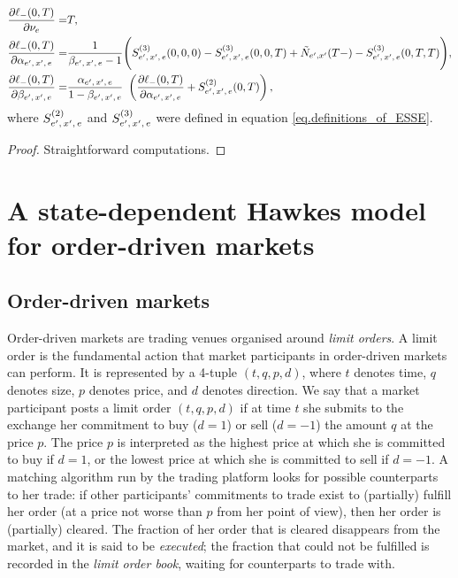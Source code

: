 \documentclass[10pt, article,table]{article}
\begin{document}
\begin{prop}
\begin{itemize}
\begin{equation}
\begin{split}
   \frac{\partial\ell_{-}(0,T)}{\partial\nu_e}
   =&
   T,
   \\
   \frac{\partial\ell_{-}(0,T)}{\partial\alpha_{e^{\prime},\, x^{\prime},\, e}}
   =&
   \frac{1}{\beta_{e^{\prime},\, x^{\prime},\, e} - 1}
   \Bigg(
   S^{(3)}_{e^{\prime},\, x^{\prime},\, e}(0,0,0)  - S^{(3)}_{e^{\prime},\, x^{\prime},\, e}(0,0,T)
    +\tilde{N}_{e^{\prime},x^{\prime}}(T-)
   - S^{(3)}_{e^{\prime},\, x^{\prime},\, e}(0,T,T)
   \Bigg),
   \\
   \frac{\partial\ell_{-}(0,T)}{\partial\beta_{e^{\prime},\, x^{\prime},\, e}}
   =&
   \frac{\alpha_{e^{\prime},\, x^{\prime},\, e}}{1-\beta_{e^{\prime},\, x^{\prime},\, e}}\
   \left(
   \frac{\partial\ell_{-}(0,T)}{\partial\alpha_{e^{\prime},\, x^{\prime},\, e}}
   +S^{(2)}_{e^{\prime},\, x^{\prime},\, e}(0,T)
   \right),
  \end{split}
 \end{equation}
 where $S^{(2)}_{e^{\prime},\, x^{\prime},\, e}$ and $S^{(3)}_{e^{\prime},\, x^{\prime},\, e}$ were defined in equation \eqref{eq.definitions_of_ESSE}.
 \end{itemize}
\end{prop}
\begin{proof}
 Straightforward computations. 
\end{proof}

\section{A state-dependent Hawkes model for order-driven markets}

\subsection{Order-driven markets}\label{sec.order-driven_markets}
Order-driven markets are trading venues organised around \emph{limit orders}. A limit order is the fundamental action that market participants in order-driven markets can perform. It is represented by a 4-tuple $(t,q,p,d)$, where $t$ denotes time, $q$ denotes size, $p$ denotes price, and $d$ denotes direction. We say that a market participant posts a limit order $(t,q,p,d)$ if at time $t$ she submits to the exchange her commitment to buy ($d=1$) or sell ($d=-1$) the amount $q$ at the price $p$. The price $p$ is interpreted as the highest price at which she is committed to buy if $d=1$, or the lowest price at which she is committed to sell if $d=-1$. A matching algorithm run by the trading platform looks for possible counterparts to her trade: if other participants' commitments to trade exist to (partially) fulfill her order (at a price not worse than $p$ from her point of view), then her order is (partially) cleared. The fraction of her order that is cleared disappears from the market, and it is said to be \emph{executed};  the fraction that could not be fulfilled is recorded in the \emph{limit order book}, waiting for counterparts to trade with.
\end{document}
